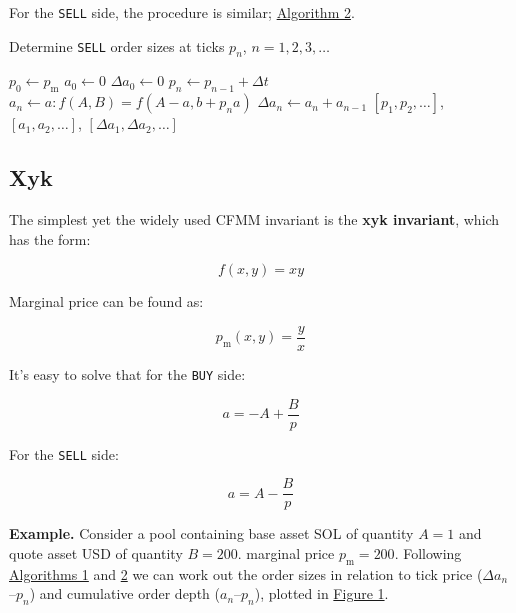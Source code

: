 \documentclass{article}
\begin{document}
For the \texttt{SELL} side, the procedure is similar; \hyperref[alg:2]{Algorithm 2}.

\begin{algorithm}
  \caption{Determine \texttt{SELL} order sizes at ticks $p_n$, $n = 1, 2, 3, \dots$}
  \label{alg:2}
  \begin{algorithmic}
    \State $p_0 \gets p_{\mathrm{m}}$
    \State $a_0 \gets 0$
    \State $\Delta a_0 \gets 0$
    \State $p_n \gets p_{n-1} + \Delta t$
    \State $a_n \gets a: f(A, B) = f(A - a, b + p_n a)$ 
    \State $\Delta a_n \gets a_n + a_{n-1}$
    \EndFor
    \State \Return $[p_1, p_2, \dots]$, $[a_1, a_2, \dots]$, $[\Delta a_1, \Delta a_2, \dots]$
  \end{algorithmic}
\end{algorithm}

\subsection{Xyk}

The simplest yet the widely used CFMM invariant is the \textbf{xyk invariant},\supercite{xykamm} which has the form:

\begin{equation}
  f(x, y) = xy
\end{equation}

Marginal price can be found as:

\begin{equation}
  p_{\mathrm{m}} (x, y) = \frac{y}{x}
\end{equation}

It's easy to solve that for the \texttt{BUY} side:

\begin{equation}
  a = -A + \frac{B}{p}
\end{equation}

For the \texttt{SELL} side:

\begin{equation}
  a = A - \frac{B}{p}
\end{equation}

\textbf{Example.} Consider a pool containing base asset SOL of quantity $A = 1$ and quote asset USD of quantity $B = 200$. marginal price $p_{\mathrm{m}} = 200$. Following \hyperref[alg:1]{Algorithms 1} and \hyperref[alg:2]{2} we can work out the order sizes in relation to tick price ($\Delta a_n$--$p_n$) and cumulative order depth ($a_n$--$p_n$), plotted in \hyperref[fig:1]{Figure 1}.
\end{document}
